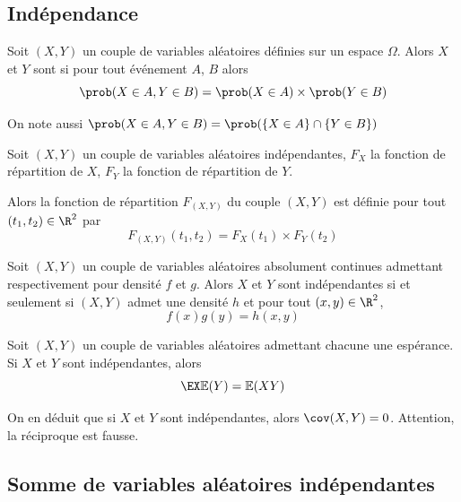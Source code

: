 		\subsection{Indépendance}
		\begin{definition}{}{}
			Soit $(X,Y)$ un couple de variables aléatoires définies sur un espace $\Omega$. Alors $X$ et $Y$ sont  si pour tout événement $A$, $B$ alors
			$$\prob(X \in A, Y \in B)=\prob(X \in A) \times \prob(Y \in B)$$
			
			On note aussi $\prob(X \in A, Y \in B) = \prob(\{X \in A\} \cap \{Y \in B\})$
		\end{definition}
		
		\begin{proposition}{}{}
			Soit $(X,Y)$ un couple de variables aléatoires indépendantes, $F_X$ la fonction de répartition de $X$, $F_Y$ la fonction de répartition de $Y$.
			
			Alors la fonction de répartition $F_{(X,Y)}$ du couple $(X,Y)$ est définie pour tout $(t_1,t_2) \in \R^2$ par 
			$$F_{(X,Y)}(t_1,t_2) = F_X(t_1) \times F_Y(t_2)$$
		\end{proposition}
		
		\begin{proposition}{}{}
			Soit $(X,Y)$ un couple de variables aléatoires absolument continues admettant respectivement pour densité $f$ et $g$. Alors $X$ et $Y$ sont indépendantes si et seulement si $(X,Y)$ admet une densité $h$ et pour tout $(x,y) \in \R^2$, 
			$$f(x)g(y)=h(x,y)$$
		\end{proposition}
		
		\begin{proposition}{}{}
			Soit $(X,Y)$ un couple de variables aléatoires admettant chacune une espérance. Si $X$ et $Y$ sont indépendantes, alors 
			$$\EX \mathbb{E}(Y) = \mathbb{E}(XY)$$
		\end{proposition}
		
		On en déduit que si $X$ et $Y$ sont indépendantes, alors $\cov(X,Y)=0$. Attention, la réciproque est fausse.
		

\subsection{Somme de variables aléatoires indépendantes}
		
